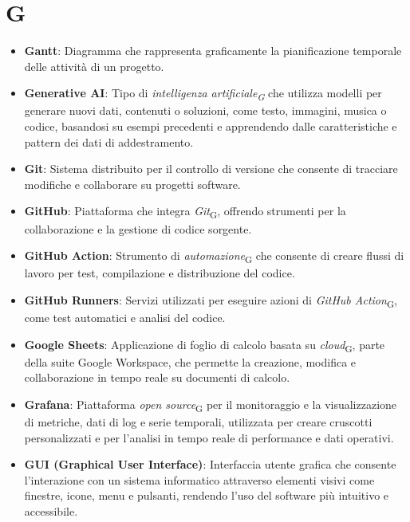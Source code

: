 \section{G}
\begin{itemize}
    \item \textbf{Gantt}: Diagramma che rappresenta graficamente la pianificazione temporale delle attività di un progetto.
    \item \textbf{Generative AI}: Tipo di \textit{intelligenza artificiale\textsubscript{G}} che utilizza modelli per generare nuovi dati, contenuti o soluzioni, come testo, immagini, musica o codice, basandosi su esempi precedenti e apprendendo dalle caratteristiche e pattern dei dati di addestramento.
    \item \textbf{Git}: Sistema distribuito per il controllo di versione che consente di tracciare modifiche e collaborare su progetti software.
    \item \textbf{GitHub}: Piattaforma che integra \textit{Git}\textsubscript{G}, offrendo strumenti per la collaborazione e la gestione di codice sorgente.
    \item \textbf{GitHub Action}: Strumento di \textit{automazione}\textsubscript{G} che consente di creare flussi di lavoro per test, compilazione e distribuzione del codice.
    \item \textbf{GitHub Runners}: Servizi utilizzati per eseguire azioni di \textit{GitHub Action}\textsubscript{G}, come test automatici e analisi del codice.
    \item \textbf{Google Sheets}: Applicazione di foglio di calcolo basata su \textit{cloud}\textsubscript{G}, parte della suite Google Workspace, che permette la creazione, modifica e collaborazione in tempo reale su documenti di calcolo.
    \item \textbf{Grafana}: Piattaforma \textit{open source}\textsubscript{G} per il monitoraggio e la visualizzazione di metriche, dati di log e serie temporali, utilizzata per creare cruscotti personalizzati e per l'analisi in tempo reale di performance e dati operativi.
    \item \textbf{GUI (Graphical User Interface)}: Interfaccia utente grafica che consente l'interazione con un sistema informatico attraverso elementi visivi come finestre, icone, menu e pulsanti, rendendo l'uso del software più intuitivo e accessibile.

\end{itemize}
